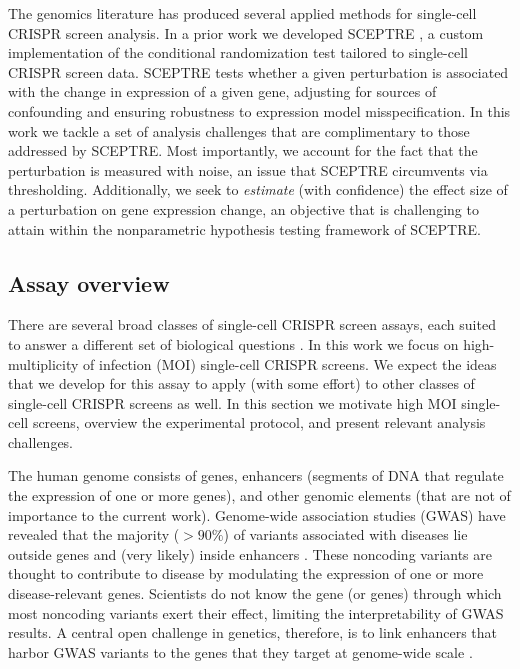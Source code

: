 \documentclass[11pt]{article}
\begin{document}
The genomics literature has produced several applied methods for single-cell CRISPR screen analysis. In a prior work we developed SCEPTRE \cite{Barry2020}, a custom implementation of the conditional randomization test \cite{Candes2018, Liu2021} tailored to single-cell CRISPR screen data. SCEPTRE tests whether a given perturbation is associated with the change in expression of a given gene, adjusting for sources of confounding and ensuring robustness to expression model misspecification. In this work we tackle a set of analysis challenges that are complimentary to those addressed by SCEPTRE. Most importantly, we account for the fact that the perturbation is measured with noise, an issue that SCEPTRE circumvents via thresholding. Additionally, we seek to \textit{estimate} (with confidence) the effect size of a perturbation on gene expression change, an objective that is challenging to attain within the nonparametric hypothesis testing framework of SCEPTRE.


\subsection{Assay overview}

There are several broad classes of single-cell CRISPR screen assays, each suited to answer a different set of biological questions \cite{Gasperini2019,Datlinger2021,Mimitou2019}. In this work we focus on high-multiplicity of infection (MOI) single-cell CRISPR screens. We expect the ideas that we develop for this assay to apply (with some effort) to other classes of single-cell CRISPR screens as well. In this section we motivate high MOI single-cell screens, overview the experimental protocol, and present relevant analysis challenges.

The human genome consists of genes, enhancers (segments of DNA that regulate the expression of one or more genes), and other genomic elements (that are not of importance to the current work). Genome-wide association studies (GWAS) have revealed that the majority ($>90\%$) of variants associated with diseases lie outside genes and (very likely) inside enhancers \cite{Gallagher2018}. These noncoding variants are thought to contribute to disease by modulating the expression of one or more disease-relevant genes. Scientists do not know the gene (or genes) through which most noncoding variants exert their effect, limiting the interpretability of GWAS results. A central open challenge in genetics, therefore, is to link enhancers that harbor GWAS variants to the genes that they target at genome-wide scale \cite{Gasperini2020}.
\end{document}
